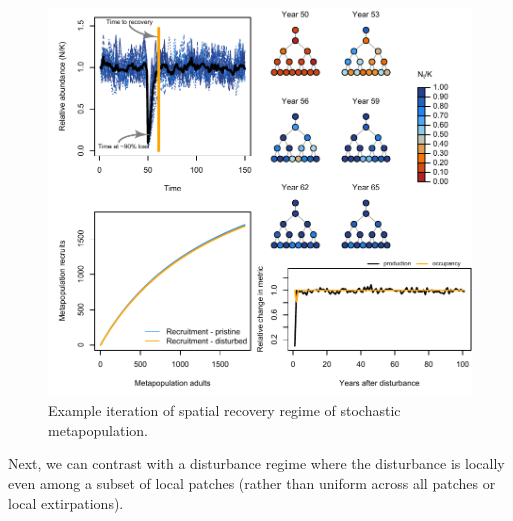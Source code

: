 \documentclass[
]{article}
\begin{document}
\begin{figure}[H]

{\centering \includegraphics{Managing_for_ecological_surprises_in_metapopulations_files/figure-latex/example results3-1} 

}

\caption{Example iteration of spatial recovery regime of stochastic metapopulation.}\label{fig:example results3}
\end{figure}
\newpage

Next, we can contrast with a disturbance regime where the disturbance is
locally even among a subset of local patches (rather than uniform across
all patches or local extirpations).
\end{document}
